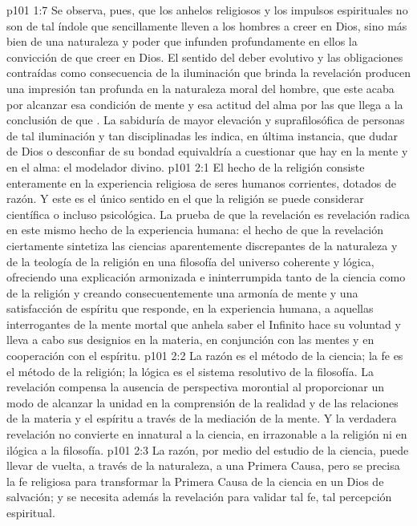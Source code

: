 \vs p101 1:7 Se observa, pues, que los anhelos religiosos y los impulsos espirituales no son de tal índole que sencillamente lleven a los hombres a  creer en Dios, sino más bien de una naturaleza y poder que infunden profundamente en ellos la convicción de que  creer en Dios. El sentido del deber evolutivo y las obligaciones contraídas como consecuencia de la iluminación que brinda la revelación producen una impresión tan profunda en la naturaleza moral del hombre, que este acaba por alcanzar esa condición de mente y esa actitud del alma por las que llega a la conclusión de que . La sabiduría de mayor elevación y suprafilosófica de personas de tal iluminación y tan disciplinadas les indica, en última instancia, que dudar de Dios o desconfiar de su bondad equivaldría a cuestionar  que hay en la mente y en el alma: el modelador divino.
\vs p101 2:1 El hecho de la religión consiste enteramente en la experiencia religiosa de seres humanos corrientes, dotados de razón. Y este es el único sentido en el que la religión se puede considerar científica o incluso psicológica. La prueba de que la revelación es revelación radica en este mismo hecho de la experiencia humana: el hecho de que la revelación ciertamente sintetiza las ciencias aparentemente discrepantes de la naturaleza y de la teología de la religión en una filosofía del universo coherente y lógica, ofreciendo una explicación armonizada e ininterrumpida tanto de la ciencia como de la religión y creando consecuentemente una armonía de mente y una satisfacción de espíritu que responde, en la experiencia humana, a aquellas interrogantes de la mente mortal que anhela saber  el Infinito hace su voluntad y lleva a cabo sus designios en la materia, en conjunción con las mentes y en cooperación con el espíritu.
\vs p101 2:2 La razón es el método de la ciencia; la fe es el método de la religión; la lógica es el sistema resolutivo de la filosofía. La revelación compensa la ausencia de perspectiva morontial al proporcionar un modo de alcanzar la unidad en la comprensión de la realidad y de las relaciones de la materia y el espíritu a través de la mediación de la mente. Y la verdadera revelación no convierte en innatural a la ciencia, en irrazonable a la religión ni en ilógica a la filosofía.
\vs p101 2:3 La razón, por medio del estudio de la ciencia, puede llevar de vuelta, a través de la naturaleza, a una Primera Causa, pero se precisa la fe religiosa para transformar la Primera Causa de la ciencia en un Dios de salvación; y se necesita además la revelación para validar tal fe, tal percepción espiritual.
